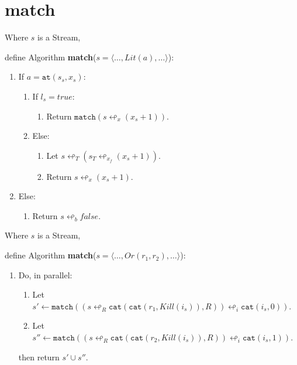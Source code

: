 \section{match}


 \begin{framed}
  Where $s$ is a Stream,

 \vspace{12pt} 
 define Algorithm \textbf{match}($s=\langle \ldots, Lit(a), \ldots \rangle$):
  \begin{enumerate}
    \item If $a = \texttt{at}(s_s, x_s)$: 
      \begin{enumerate}
      \item If $l_s = true$: 
        \begin{enumerate} 
           \item Return $\texttt{match}(s \looparrowleft_x (x_s + 1))$.
         \end{enumerate} 
       \item Else: 
         \begin{enumerate}
           \item Let $s \looparrowleft_T (s_T \looparrowleft_{x_f} (x_s + 1))$.
           \item Return $s \looparrowleft_x (x_s + 1)$.
         \end{enumerate} 
      \end{enumerate} 
     \item Else: 
     \begin{enumerate} 
       \item Return $s \looparrowleft_b false$.
     \end{enumerate} 
  \end{enumerate}
 \end{framed}

\begin{framed}
  Where $s$ is a Stream,

 \vspace{12pt}
 define Algorithm \textbf{match}($s=\langle \ldots, Or(r_1, r_2), \ldots \rangle$):

 \begin{enumerate}
   \item Do, in parallel:
   \begin{enumerate}
     \item Let $s'  \leftarrow \texttt{match}( (s \looparrowleft_R \texttt{cat}(\texttt{cat}(r_1, Kill(i_s)), R)) \looparrowleft_i \texttt{cat}(i_s,0))$.
     \item Let $s'' \leftarrow \texttt{match}( (s \looparrowleft_R \texttt{cat}(\texttt{cat}(r_2, Kill(i_s)), R)) \looparrowleft_i \texttt{cat}(i_s,1))$.
   \end{enumerate}
   then return $s' \cup s''$.
 \end{enumerate}

\end{framed}


